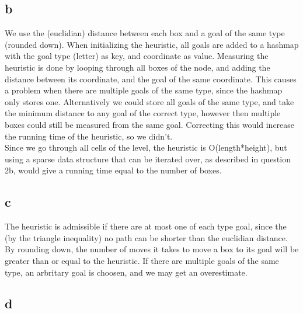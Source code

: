 \documentclass{article}
\begin{document}
\subsection{b}
We use the (euclidian) distance between each box and a goal of the same type (rounded down). When initializing the heuristic, all goals are added to a hashmap with the goal type (letter) as key, and coordinate as value. Measuring the heuristic is done by looping through all boxes of the node, and adding the distance between its
coordinate, and the goal of the same coordinate. This causes a problem when there are multiple goals of the same type, since the hashmap only stores one. Alternatively we could store all goals of the same type, and take the minimum distance to any goal of the correct type, however then multiple boxes could still be measured from the same goal. Correcting this would increase the running time of the heuristic, so we didn't.\\

Since we go through all cells of the level, the heuristic is O(length*height), but using a sparse data structure that can be iterated over, as described in question 2b, would give a running time equal to the number of boxes.

\subsection{c}
The heuristic is admissible if there are at most one of each type goal, since the (by the triangle inequality) no path can be shorter than the euclidian distance. By rounding down, the number of moves it takes to move
a box to its goal will be greater than or equal to the heuristic. If there are multiple goals of the same type, an arbritary goal is choosen, and we may get an overestimate.

\subsection{d}
\end{document}
